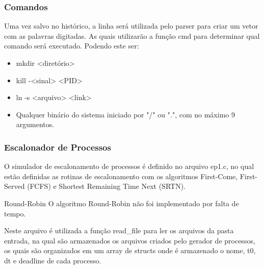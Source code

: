 \documentclass{beamer}
\begin{document}
\begin{frame}
\frametitle{Comandos}

Uma vez salvo no histórico, a linha será utilizada pelo parser para criar um vetor com as palavras digitadas. As quais
utilizarão a função cmd para determinar qual comando será executado. Podendo este ser:

\begin{itemize}
    \item mkdir <diretório>
    \item kill -<sinal> <PID>
    \item ln -s <arquivo> <link>
    \item Qualquer binário do sistema iniciado por "/" ou ".", com no máximo 9 argumentos.
\end{itemize}
\end{frame}

\begin{frame}
\frametitle{Escalonador de Processos}
O simulador de escalonamento de processos é definido no arquivo ep1.c, no qual estão definidas as rotinas de
    escalonamento com os algoritmos First-Come, First-Served (FCFS) e Shortest Remaining Time Next (SRTN).

\begin{block}{Round-Robin}
O algoritmo Round-Robin não foi implementado por falta de tempo.
\end{block}

Neste arquivo é utilizada a função read\_file para ler os arquivos da pasta entrada, na qual são armazenados os arquivos
criados pelo gerador de processos, os quais são organizados em um array de structs onde é armazenado o nome, t0, dt e
    deadline de cada processo.
\end{frame}
\end{document}
